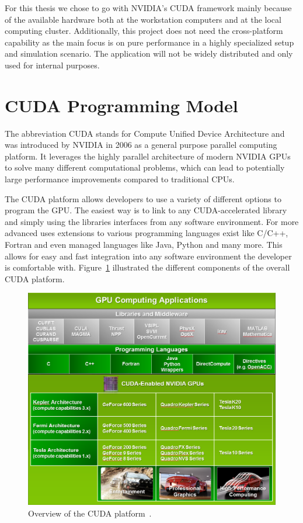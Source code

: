 For this thesis we chose to go with NVIDIA's CUDA framework mainly because of the available hardware both at the workstation computers and at the local computing cluster. Additionally, this project does not need the cross-platform capability as the main focus is on pure performance in a highly specialized setup and simulation scenario. The application will not be widely distributed and only used for internal purposes.

\section{CUDA Programming Model}
\label{sec:CUDA}
The abbreviation CUDA stands for Compute Unified Device Architecture and was introduced by NVIDIA in 2006 as a general purpose parallel computing platform. It leverages the highly parallel architecture of modern NVIDIA GPUs to solve many different computational problems, which can lead to potentially large performance improvements compared to traditional CPUs.

The CUDA platform allows developers to use a variety of different options to program the GPU. The easiest way is to link to any CUDA-accelerated library and simply using the libraries interfaces from any software environment. For more advanced uses extensions to various programming languages exist like C/C++, Fortran and even managed languages like Java, Python and many more. This allows for easy and fast integration into any software environment the developer is comfortable with. Figure~\ref{fig:cuda_overview} illustrated the different components of the overall CUDA platform.

\begin{figure}[!htbp]
  \centering
  \includegraphics[width=.9\textwidth]{img/cuda_overview.png}
  \caption[Overview of the CUDA platform.]{Overview of the CUDA platform~\cite{CudaProgrammingGuide}.}
  \label{fig:cuda_overview}
\end{figure}

